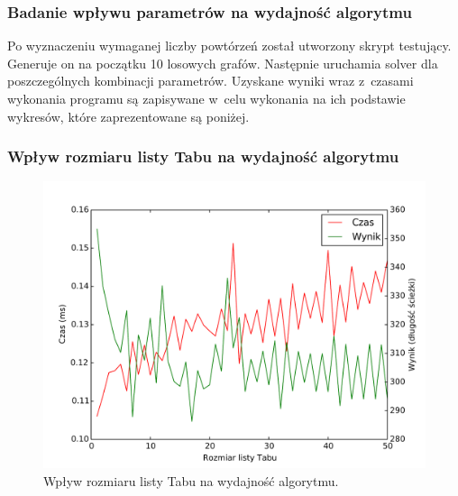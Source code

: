 \documentclass[11pt,a4paper]{article}
\begin{document}
\subsubsection{Badanie wpływu parametrów na wydajność algorytmu}
Po wyznaczeniu wymaganej liczby powtórzeń został utworzony skrypt testujący. Generuje on na początku 10 losowych grafów. Następnie uruchamia solver dla poszczególnych kombinacji parametrów. Uzyskane wyniki wraz z~czasami wykonania programu są zapisywane w~celu wykonania na ich podstawie wykresów, które zaprezentowane są poniżej.

\subsubsection{Wpływ rozmiaru listy Tabu na wydajność algorytmu}
\begin{figure}[H]
\includegraphics[trim = 0mm 3mm 0mm 12mm, clip, width=14cm]{graphs/tabuListSize.pdf}
\caption{Wpływ rozmiaru listy Tabu na wydajność algorytmu.}
\end{figure}
\end{document}
